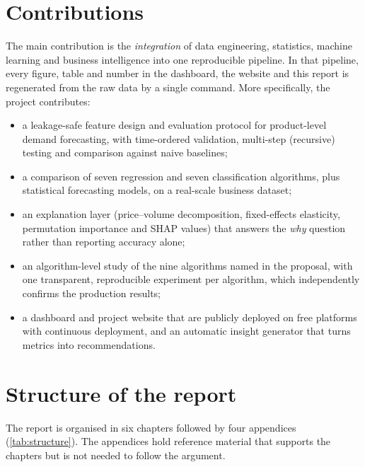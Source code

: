 \section{Contributions}
The main contribution is the \emph{integration} of data engineering, statistics, machine learning and business
intelligence into one reproducible pipeline. In that pipeline, every figure, table and number in the dashboard,
the website and this report is regenerated from the raw data by a single command. More specifically, the
project contributes:
\begin{itemize}
  \item a leakage-safe feature design and evaluation protocol for product-level demand forecasting, with
        time-ordered validation, multi-step (recursive) testing and comparison against naive baselines;
  \item a comparison of seven regression and seven classification algorithms, plus statistical forecasting
        models, on a real-scale business dataset;
  \item an explanation layer (price--volume decomposition, fixed-effects elasticity, permutation importance and
        SHAP values) that answers the \emph{why} question rather than reporting accuracy alone;
  \item an algorithm-level study of the nine algorithms named in the proposal, with one transparent,
        reproducible experiment per algorithm, which independently confirms the production results;
  \item a dashboard and project website that are publicly deployed on free platforms with continuous
        deployment, and an automatic insight generator that turns metrics into recommendations.
\end{itemize}

\section{Structure of the report}
The report is organised in six chapters followed by four appendices (\cref{tab:structure}). The appendices
hold reference material that supports the chapters but is not needed to follow the argument.

